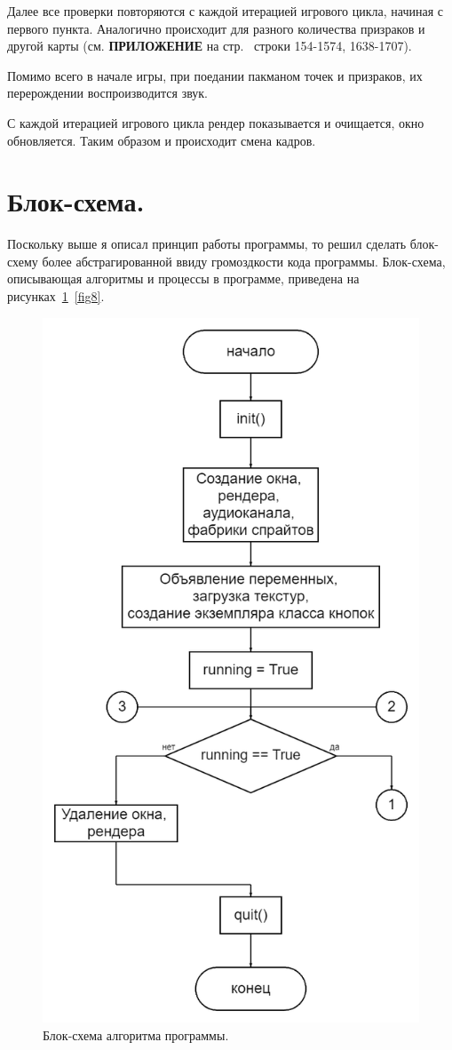 Далее все проверки повторяются с каждой итерацией игрового цикла, начиная с первого пункта. Аналогично происходит для разного количества призраков и другой карты (см. \textbf{\textsc{ПРИЛОЖЕНИЕ}} на стр.~\pageref{code:main} строки 154-1574, 1638-1707).

Помимо всего в начале игры, при поедании пакманом точек и призраков, их перерождении воспроизводится звук.

С каждой итерацией игрового цикла рендер показывается и очищается, окно обновляется. Таким образом и происходит смена кадров.

\section{\label{sec:ch02/sec01/sub08}Блок-схема.}
Поскольку выше я описал принцип работы программы, то решил сделать блок-схему более абстрагированной ввиду громоздкости кода программы. Блок-схема, описывающая алгоритмы и процессы в программе, приведена на рисунках~\ref{fig7}~\ref{fig8}.
\begin{figure}[H]
	\centering
	\includegraphics[width=0.8\linewidth]{images/flow1.png}
	\caption{Блок-схема алгоритма программы.}
	\label{fig7}
\end{figure}
